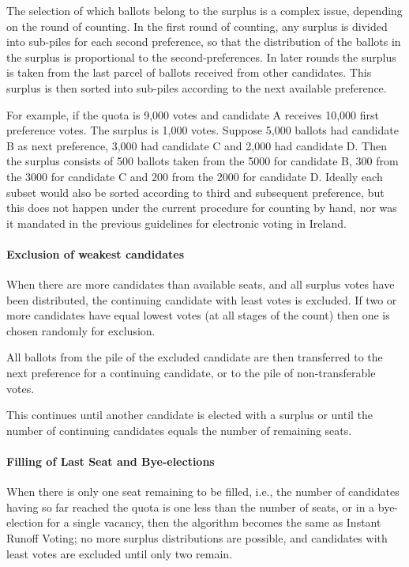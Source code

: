 \documentclass[runningheads,a4paper]{llncs}
\newcommand{\ie}{i.e.,\xspace}
\begin{document}
The selection of which ballots belong to the surplus is a complex
issue, depending on the round of counting.  In the first round of
counting, any surplus is divided into sub-piles for each second
preference, so that the distribution of the ballots in the surplus is
proportional to the second-preferences.  In later rounds the surplus
is taken from the last parcel of ballots received from other
candidates.  This surplus is then sorted into sub-piles according to
the next available preference.

For example, if the quota is 9,000 votes and candidate A receives
10,000 first preference votes.  The surplus is 1,000 votes.  Suppose
5,000 ballots had candidate B as next preference, 3,000 had candidate
C and 2,000 had candidate D. Then the surplus consists of 500 ballots
taken from the 5000 for candidate B, 300 from the 3000 for candidate C
and 200 from the 2000 for candidate D. Ideally each subset would also
be sorted according to third and subsequent preference, but this does
not happen under the current procedure for counting by hand, nor was
it mandated in the previous guidelines for electronic voting in
Ireland.

\paragraph{Exclusion of weakest candidates}

When there are more candidates than available seats, and all surplus
votes have been distributed, the continuing candidate with least votes
is excluded.  If two or more candidates have equal lowest votes (at
all stages of the count) then
one is chosen randomly for exclusion.

All ballots from the pile of the excluded candidate are then transferred to
the next preference for a continuing candidate, or to the pile of
non-transferable votes.

This continues until another candidate is
elected with a surplus or until the number of continuing candidates
equals the number of remaining seats.

\paragraph{Filling of Last Seat and Bye-elections}
When there is only one seat remaining to be filled, \ie the number of
candidates having so far reached the quota is one less than the number
of seats, or in a bye-election for a single vacancy, then the
algorithm becomes the same as Instant Runoff Voting; no more surplus
distributions are possible, and candidates with least votes are
excluded until only two remain.
\end{document}
